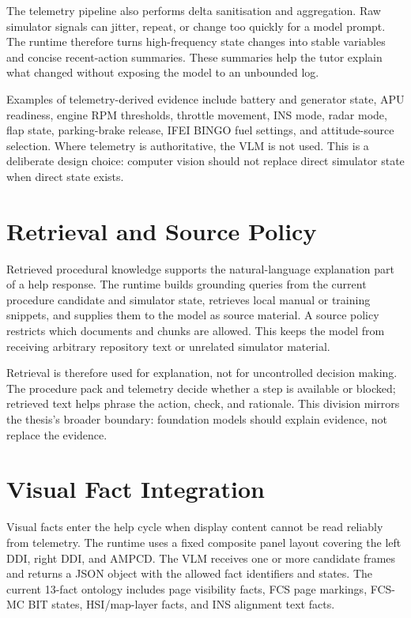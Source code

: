 The telemetry pipeline also performs delta sanitisation and aggregation. Raw
simulator signals can jitter, repeat, or change too quickly for a model prompt.
The runtime therefore turns high-frequency state changes into stable variables
and concise recent-action summaries. These summaries help the tutor explain
what changed without exposing the model to an unbounded log.

Examples of telemetry-derived evidence include battery and generator state,
APU readiness, engine RPM thresholds, throttle movement, INS mode, radar mode,
flap state, parking-brake release, IFEI BINGO fuel settings, and attitude-source
selection. Where telemetry is authoritative, the VLM is not used. This is a
deliberate design choice: computer vision should not replace direct simulator
state when direct state exists.

\section{Retrieval and Source Policy}\label{sec:design-retrieval}

Retrieved procedural knowledge supports the natural-language explanation part
of a help response. The runtime builds grounding queries from the current
procedure candidate and simulator state, retrieves local manual or training
snippets, and supplies them to the model as source material. A source policy
restricts which documents and chunks are allowed. This keeps the model from
receiving arbitrary repository text or unrelated simulator material.

Retrieval is therefore used for explanation, not for uncontrolled decision
making. The procedure pack and telemetry decide whether a step is available or
blocked; retrieved text helps phrase the action, check, and rationale. This
division mirrors the thesis's broader boundary: foundation models should
explain evidence, not replace the evidence.

\section{Visual Fact Integration}\label{sec:design-vision}

Visual facts enter the help cycle when display content cannot be read reliably
from telemetry. The runtime uses a fixed composite panel layout covering the
left DDI, right DDI, and AMPCD. The VLM receives one or more candidate frames
and returns a JSON object with the allowed fact identifiers and states. The
current 13-fact ontology includes page visibility facts, FCS page markings,
FCS-MC BIT states, HSI/map-layer facts, and INS alignment text facts.

